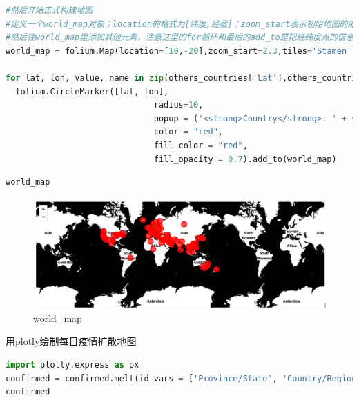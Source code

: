 \documentclass[UTF8,a4paper,12pt]{ctexart}  %
\begin{document}
\begin{lstlisting}[language=Python]
#然后开始正式构建地图
#定义一个world_map对象；location的格式为[纬度,经度]；zoom_start表示初始地图的缩放尺寸，数值越大放大程度越大；tiles为地图类型，用于控制绘图调用的地图样式，默认为'OpenStreetMap'，也有一些其他的内建地图样式，如'Stamen  Terrain'、'Stamen Toner'、'Mapbox Bright'、'Mapbox Control Room'等；也可以传入'None'来绘制一个没有风格的朴素地图，或传入一个URL来使用其它的自选osm。
#然后往world_map里添加其他元素，注意这里的for循环和最后的add_to是把经纬度点的信息一个一个的加进去
world_map = folium.Map(location=[10,-20],zoom_start=2.3,tiles='Stamen Toner')

for lat, lon, value, name in zip(others_countries['Lat'],others_countries['Long'],others_countries['confirmed'],others_countries['Country/Region']):
  folium.CircleMarker([lat, lon],
                              radius=10,
                              popup = ('<strong>Country</strong>: ' + str(name).capitalize()+'<br>' '<strong>Confirmed Cases</strong>: ' + str(value) + '<br>'),
                              color = "red",
                              fill_color = "red",
                              fill_opacity = 0.7).add_to(world_map)
\end{lstlisting}

\begin{lstlisting}[language=Python]
world_map
\end{lstlisting}

\begin{figure}
\centering
\includegraphics{./world_map.png}
\caption{world\_map}
\end{figure}

用plotly绘制每日疫情扩散地图

\begin{lstlisting}[language=Python]
import plotly.express as px
confirmed = confirmed.melt(id_vars = ['Province/State', 'Country/Region', 'Lat', 'Long'], var_name='date',value_name = 'confirmed')
confirmed
\end{lstlisting}
\end{document}

